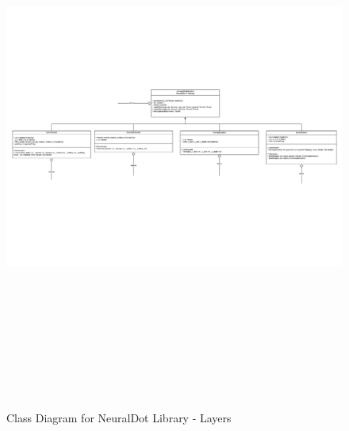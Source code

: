 \begin{figure}[H]
    \centering
    \includegraphics[width=18cm, height=18cm, angle=90]{Design/Overview/UMLCharts/NeuralDotUMLSeperated-Layer.pdf}
    \caption{Class Diagram for NeuralDot Library - Layers}
    \label{fig:Class Diagram for NeuralDot Library - Layers}
\end{figure}

